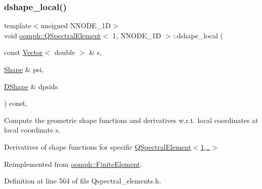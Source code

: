 \subsubsection{\texorpdfstring{dshape\+\_\+local()}{dshape\_local()}}
{\footnotesize\ttfamily template$<$unsigned N\+N\+O\+D\+E\+\_\+1D$>$ \\
void \hyperlink{classoomph_1_1QSpectralElement}{oomph\+::\+Q\+Spectral\+Element}$<$ 1, N\+N\+O\+D\+E\+\_\+1D $>$\+::dshape\+\_\+local (\begin{DoxyParamCaption}\item[{const \hyperlink{classoomph_1_1Vector}{Vector}$<$ double $>$ \&}]{s,  }\item[{\hyperlink{classoomph_1_1Shape}{Shape} \&}]{psi,  }\item[{\hyperlink{classoomph_1_1DShape}{D\+Shape} \&}]{dpsids }\end{DoxyParamCaption}) const\hspace{0.3cm}{\ttfamily [inline]}, {\ttfamily [virtual]}}



Compute the geometric shape functions and derivatives w.\+r.\+t. local coordinates at local coordinate s. 

Derivatives of shape functions for specific \hyperlink{classoomph_1_1QSpectralElement_3_011_00_01NNODE__1D_01_4_a747bf14338887c74303f56febdfba957}{Q\+Spectral\+Element$<$1,..$>$} 

Reimplemented from \hyperlink{classoomph_1_1FiniteElement_a9db1456b827131c21a991ac9fedf4b0c}{oomph\+::\+Finite\+Element}.



Definition at line 564 of file Qspectral\+\_\+elements.\+h.

\mbox{\label{classoomph_1_1QSpectralElement_3_011_00_01NNODE__1D_01_4_aea5a330832dea0920a948660745e6f01}} 
